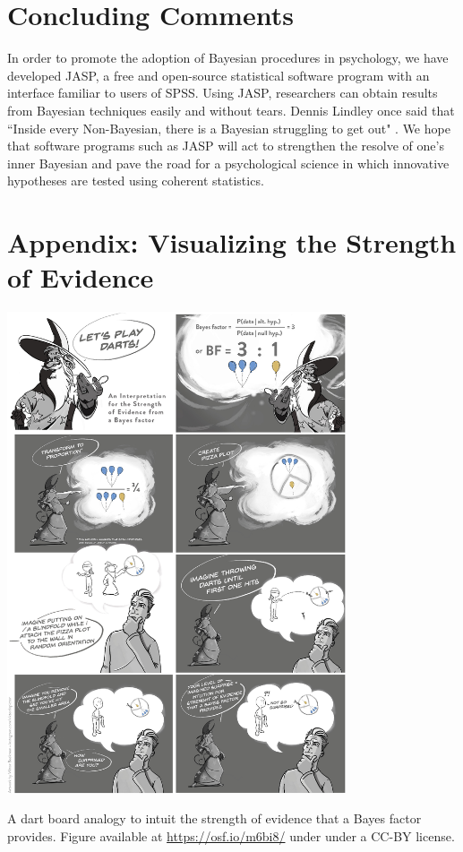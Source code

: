 \section{Concluding Comments}
In order to promote the adoption of Bayesian procedures in psychology, we have developed JASP, a free and open-source statistical software program with an interface familiar to users of SPSS. Using JASP, researchers can obtain results from Bayesian techniques easily and without tears. Dennis Lindley once said that ``Inside every Non-Bayesian, there is a Bayesian struggling to get out" \cite{Jaynes2003}. We hope that software programs such as JASP will act to strengthen the resolve of one's inner Bayesian and pave the road for a psychological science in which innovative hypotheses are tested using coherent statistics.




\section*{Appendix: Visualizing the Strength of Evidence}
\begin{center}
\includegraphics[width=0.75\textwidth]{figs/bi2_LetsPlayDarts.eps}%
\end{center}
\noindent A dart board analogy to intuit the strength of evidence that a Bayes factor provides. Figure available at \url{https://osf.io/m6bi8/} under under a CC-BY license.

